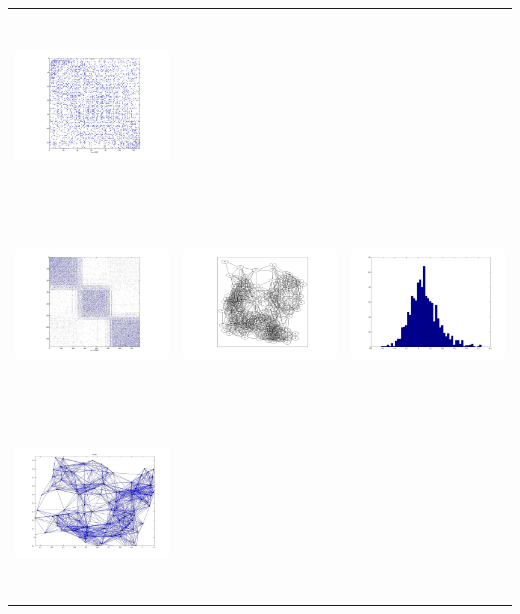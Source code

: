 \begin{tabular}{ |c|c|c| }
\includegraphics[width=5.0cm,height=5.0cm]{images/RandomGraphAdjacencyMatrix_WithCut_jpg.jpg} \\
\includegraphics[width=5.0cm,height=5.0cm]{images/RandomGraphOptimalEdgeInputGraph_256_Nodes_AdjacencyMatrix.jpg} &
\includegraphics[width=5.0cm,height=5.0cm]{images/RandomGraphOptimalEdgeInputGraph_AdjacencyMatrix.jpg}            &
\includegraphics[width=5.0cm,height=5.0cm]{images/RandomGraphOptimalEdgeInputGraph_EdgeWeightHist_FMMC.jpg}         \\
\includegraphics[width=5.0cm,height=5.0cm]{images/RandomGraphOptimalEdgeInputGraph_IncidenceMatrix.jpg}               &

\end{tabular}
